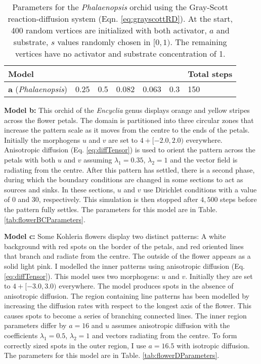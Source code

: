 \begin{table}[ht]
	\centering
	\begin{tabular}{lllllll}
	\hline
	\textbf{Model} & \bm{$D_a$} &\bm{$D_s$} &\bm{$F$} &\bm{$k$} &\bm{$dt$} & \textbf{Total steps} \\ \hline 
	\textbf{a} (\textit{Phalaenopsis})& 0.25& 0.5 &0.082 &0.063 &0.3 &150                \\ \hline
	\end{tabular}
	\caption[Parameters for the \textit{Phalaenopsis} orchid using the Gray-Scott reaction-diffusion system]{Parameters for the \textit{Phalaenopsis} orchid using the Gray-Scott reaction-diffusion system (Eqn. \ref{eq:grayscottRD}). At the start, 400 random vertices are initialized with both activator, $a$ and substrate, $s$ values randomly chosen in $[0, 1)$. The remaining vertices have no activator and substrate concentration of 1.}
	\label{tab:flowerAParameters}
\end{table}

\textbf{Model b:}
This orchid of the \textit{Encyclia} genus displays orange and yellow stripes across the flower petals. The domain is partitioned into three circular zones that increase the pattern scale as it moves from the centre to the ends of the petals. Initially the morphogens $u$ and $v$ are set to $4 + [-2.0, 2.0)$ everywhere. Anisotropic diffusion (Eq. \ref{eq:diffTensor}) is used to orient the pattern across the petals with both $u$ and $v$ assuming $\lambda_1=0.35$, $\lambda_2=1$ and the vector field is radiating from the centre. After this pattern has settled, there is a second phase, during which the boundary conditions are changed in some sections to act as sources and sinks. In these sections, $u$ and $v$ use Dirichlet conditions with a value of $0$ and $30$, respectively. This simulation is then stopped after $4,500$ steps before the pattern fully settles. The parameters for this model are in Table. \ref{tab:flowerBCParameters}.

\textbf{Model c:}
Some Kohleria flowers display two distinct patterns: A white background with red spots on the border of the petals, and red oriented lines that branch and radiate from the centre. The outside of the flower appears as a solid light pink. I modelled the inner patterns using anisotropic diffusion (Eq. \ref{eq:diffTensor}). This model uses two morphogens: $u$ and $v$. Initially they are set to $4 + [-3.0, 3.0)$ everywhere. The model produces spots in the absence of anisotropic diffusion. The region containing line patterns has been modelled by increasing the diffusion rates with respect to the longest axis of the flower. This causes spots to become a series of branching connected lines. The inner region parameters differ by $a=16$ and $u$  assumes anisotropic diffusion with the coefficients $\lambda_{1}=0.5$, $\lambda_{2}=1$ and vectors radiating from the centre. To form correctly sized spots in the outer region, I use $a=16.5$ with isotropic diffusion. The parameters for this model are in Table. \ref{tab:flowerDParameters}.

